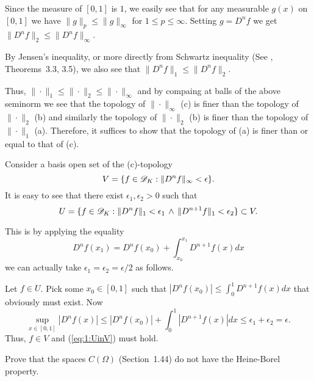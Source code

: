 \begin{enumerate}
Since the measure of \([0,1]\) is $1$, we easily see that
for any measurable \(g(x)\) on \([0,1]\) we have
\(\|g\|_p \leq \|g\|_\infty \) for \(1\leq p \leq \infty\). 
Setting \(g=D^n f\) we get
 \(\|D^n f\|_2 \leq \|D^n f\|_\infty\).

By Jensen's inequality, 
or more directly from 
Schwartz inequality (See \cite{RudinRCA80}, Theorems~3.3, 3.5),
we also see that \(\|D^n f\|_1 \leq \|D^n f\|_2\).

Thus, \( \|\cdot\|_1 \leq \|\cdot\|_2 \leq \|\cdot\|_\infty\)
and by compaing at balls of the above seminorm
we see that 
the topology of 
\(\|\cdot\|_\infty\) (c) is finer than the topology of \(\|\cdot\|_2\) (b)
and similarly
the topology of 
\(\|\cdot\|_2\) (b) is finer than the topology of \(\|\cdot\|_1\) (a).
Therefore, it suffices to show that the topology of (a) is finer than or equal
to that of (c).

Consider a basis open set of the (c)-topology 
\begin{equation*}
 V = \{f\in \mathscr{D}_K: \|D^n f\|_\infty < \epsilon\}.
\end{equation*}
It is easy to see that there exist \(\epsilon_1,\epsilon_2>0\) such that
\begin{equation} \label{eq:1:UinV}
 U = \{f\in \mathscr{D}_K: 
          \|D^n f\|_1 < \epsilon_1 
          \,\wedge\,
          \|D^{n+1} f\|_1 < \epsilon_2 
      \} \subset V.
\end{equation}

This is by applying the equality
\begin{equation*}
D^n f(x_1) = D^n f(x_0) + \int_{x_0}^{x_1} D^{n+1} f(x)dx
\end{equation*}
we can actually take \(\epsilon_1 = \epsilon_2 = \epsilon/2\) as follows.

Let \(f\in U\).
Pick some \(x_0\in[0,1]\) 
such that \(|D^n f(x_0)| \leq \int_0^1 D^{n+1} f(x)dx\)
that obviously must exist. Now
\begin{equation*}
\sup_{x\in[0,1]} |D^n f(x)| \leq |D^n f(x_0)| + \int_0^1 |D^{n+1} f(x)|dx
 \leq \epsilon_1 + \epsilon_2 = \epsilon.
\end{equation*}
Thus, \(f\in V\) and (\ref{eq:1:UinV}) must hold.

\begin{excopy}
Prove that the spaces \(C(\Omega)\) (Section~1.44) do not have the
Heine-Borel property.
\end{excopy}


\end{enumerate}
